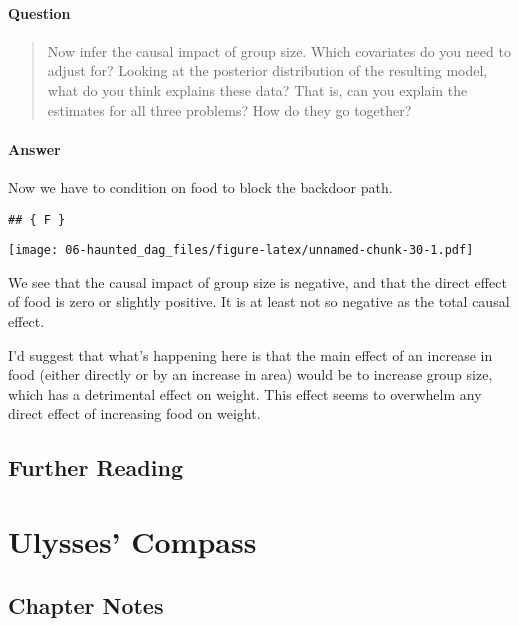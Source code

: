 \documentclass[
]{book}
\begin{document}
\hypertarget{question-59}{%
\subsubsection*{Question}\label{question-59}}

\begin{quote}
Now infer the causal impact of group size. Which covariates do you need to adjust for? Looking at the posterior distribution of the resulting model, what do you think explains these data? That is, can you explain the estimates for all three problems? How do they go together?
\end{quote}

\hypertarget{answer-59}{%
\subsubsection*{Answer}\label{answer-59}}

Now we have to condition on food to block the backdoor path.

\begin{verbatim}
## { F }
\end{verbatim}

\texttt{[image: 06-haunted\_dag\_files/figure-latex/unnamed-chunk-30-1.pdf]}

We see that the causal impact of group size is negative, and that the direct effect of food is zero or slightly positive. It is at least not so negative as the total causal effect.

I'd suggest that what's happening here is that the main effect of an increase in food (either directly or by an increase in area) would be to increase group size, which has a detrimental effect on weight. This effect seems to overwhelm any direct effect of increasing food on weight.

\hypertarget{further-reading-5}{%
\section*{Further Reading}\label{further-reading-5}}

\hypertarget{ulysses}{%
\chapter{Ulysses' Compass}\label{ulysses}}

\hypertarget{chapter-notes-6}{%
\section{Chapter Notes}\label{chapter-notes-6}}
\end{document}
